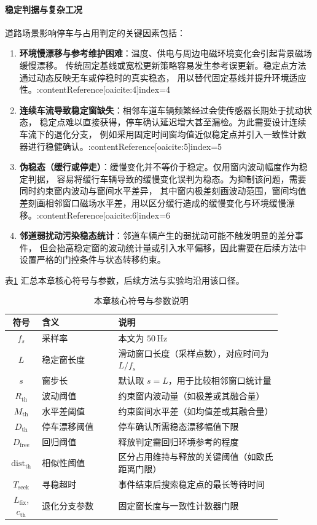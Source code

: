 \documentclass{xdupgthesis}
\begin{document}
\paragraph{稳定判据与复杂工况}
道路场景影响停车与占用判定的关键因素包括：
\begin{enumerate}
  \item \textbf{环境慢漂移与参考维护困难}：温度、供电与周边电磁环境变化会引起背景磁场缓慢漂移。
  传统固定基线或宽松更新策略容易发生参考误更新。稳定点方法通过动态反映无车或停稳时的真实稳态，
  用以替代固定基线并提升环境适应性。:contentReference[oaicite:4]{index=4}
  \item \textbf{连续车流导致稳定窗缺失}：相邻车道车辆频繁经过会使传感器长期处于扰动状态，
  稳定点难以直接获得，停车确认延迟增大甚至漏检。为此需要设计连续车流下的退化分支，
  例如采用固定时间窗均值近似稳定点并引入一致性计数器进行稳健确认。:contentReference[oaicite:5]{index=5}
  \item \textbf{伪稳态（缓行或停走）}：缓慢变化并不等价于稳定。仅用窗内波动幅度作为稳定判据，
  容易将缓行车辆导致的缓慢变化误判为稳态。为抑制该问题，需要同时约束窗内波动与窗间水平差异，
  其中窗内极差刻画波动范围，窗间均值差刻画相邻窗口磁场水平差，用以区分缓行造成的缓慢变化与环境缓慢漂移。:contentReference[oaicite:6]{index=6}
  \item \textbf{邻道弱扰动污染稳态统计}：邻道车辆产生的弱扰动可能不触发明显的差分事件，
  但会抬高稳定窗的波动统计量或引入水平偏移，因此需要在后续方法中设置严格的门控条件与状态转移约束。
\end{enumerate}

表\ref{tab:ch4_keyparams} 汇总本章核心符号与参数，后续方法与实验均沿用该口径。

\begin{table}[t]
\centering
\caption{本章核心符号与参数说明}
\label{tab:ch4_keyparams}
\begin{tabular}{c p{0.28\linewidth} p{0.60\linewidth}}
\hline
符号 & 含义 & 说明 \\
\hline
$f_s$ & 采样率 & 本文为 $50\,\mathrm{Hz}$ \\
$L$ & 稳定窗长度 & 滑动窗口长度（采样点数），对应时间为 $L/f_s$ \\
$s$ & 窗步长 & 默认取 $s=L$，用于比较相邻窗口统计量 \\
$R_{\mathrm{th}}$ & 波动阈值 & 约束窗内波动量（如极差或其融合量） \\
$M_{\mathrm{th}}$ & 水平差阈值 & 约束窗间水平差（如均值差或其融合量） \\
$D_{\mathrm{th}}$ & 停车漂移阈值 & 停车确认所需稳态漂移幅值下限 \\
$D_{\mathrm{free}}$ & 回归阈值 & 释放判定需回归环境参考的程度 \\
$\mathrm{dist}_{\mathrm{th}}$ & 相似性阈值 & 区分占用维持与释放的关键阈值（如欧氏距离门限） \\
$T_{\mathrm{seek}}$ & 寻稳超时 & 事件结束后搜索稳定点的最长等待时间 \\
$L_{\mathrm{fix}}$, $c_{\mathrm{th}}$ & 退化分支参数 & 固定窗长度与一致性计数器门限 \\
\hline
\end{tabular}
\end{table}
\end{document}
